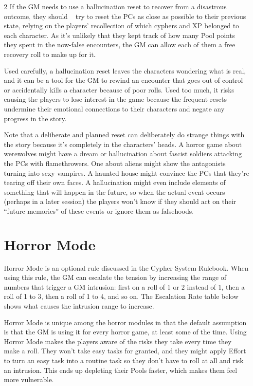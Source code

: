 \begin{multicols}{2}
If the GM needs to use a hallucination reset to recover from a disastrous outcome, they should   try to reset the PCs as close as possible to their previous state, relying on the players’ recollection of which cyphers and XP belonged to each character. As it’s unlikely that they kept track of how many Pool points they spent in the now-false encounters, the GM can allow each of them a free recovery roll to make up for it.

Used carefully, a hallucination reset leaves the characters wondering what is real, and it can be a tool for the GM to rewind an encounter that goes out of control or accidentally kills a character because of poor rolls. Used too much, it risks causing the players to lose interest in the game because the frequent resets undermine their emotional connections to their characters and negate any progress in the story.

Note that a deliberate and planned reset can deliberately do strange things with the story because it’s completely in the characters’ heads. A horror game about werewolves might have a dream or hallucination about fascist soldiers attacking the PCs with flamethrowers. One about aliens might show the antagonists turning into sexy vampires. A haunted house might convince the PCs that they’re tearing off their own faces. A hallucination might even include elements of something that will happen in the future, so when the actual event occurs (perhaps in a later session) the players won’t know if they should act on their “future memories” of these events or ignore them as falsehoods.

\section{Horror Mode}

Horror Mode is an optional rule discussed in the Cypher System Rulebook. When using this rule, the GM can escalate the tension by increasing the range of numbers that trigger a GM intrusion: first on a roll of 1 or 2 instead of 1, then a roll of 1 to 3, then a roll of 1 to 4, and so on. The Escalation Rate table below shows what causes the intrusion range to increase.

Horror Mode is unique among the horror modules in that the default assumption is that the GM is using it for every horror game, at least some of the time. Using Horror Mode makes the players aware of the risks they take every time they make a roll. They won’t take easy tasks for granted, and they might apply Effort to turn an easy task into a routine task so they don’t have to roll at all and risk an intrusion. This ends up depleting their Pools faster, which makes them feel more vulnerable.

\end{multicols}

